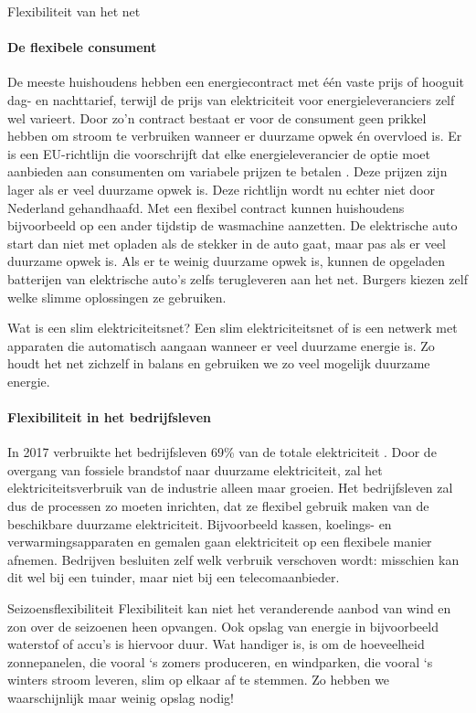 \begin{voorstel}{Flexibiliteit van het net}
\begin{multicols*}{2}
\begin{overwegingen}
\paragraph{De flexibele consument}
De meeste huishoudens hebben een energiecontract met één vaste prijs of hooguit dag- en nachttarief, terwijl de prijs van elektriciteit voor energieleveranciers zelf wel varieert. Door zo'n contract bestaat er voor de consument geen prikkel hebben om stroom te verbruiken wanneer er duurzame opwek én overvloed is. Er is een EU-richtlijn die voorschrijft dat elke energieleverancier de optie moet aanbieden aan consumenten om variabele prijzen te betalen \parencite{europees_parlement_richtlijn_2019}. Deze prijzen zijn lager als er veel duurzame opwek is. Deze richtlijn wordt nu echter niet door Nederland gehandhaafd. Met een flexibel contract kunnen huishoudens bijvoorbeeld op een ander tijdstip de wasmachine aanzetten. De elektrische auto start dan niet met opladen als de stekker in de auto gaat, maar pas als er veel duurzame opwek is. Als er te weinig duurzame opwek is, kunnen de opgeladen batterijen van elektrische auto’s zelfs terugleveren aan het net. Burgers kiezen zelf welke slimme oplossingen ze gebruiken.

\begin{infobox}{Wat is een slim elektriciteitsnet?}
Een slim elektriciteitsnet of  is een netwerk met apparaten die automatisch aangaan wanneer er veel duurzame energie is. Zo houdt het net zichzelf in balans en gebruiken we zo veel mogelijk duurzame energie.
\end{infobox}

\paragraph{Flexibiliteit in het bedrijfsleven}
In 2017 verbruikte het bedrijfsleven 69\% van de totale elektriciteit \parencite{centraal_bureau_voor_de_statistiek_statline_nodate}. Door de overgang van fossiele brandstof naar duurzame elektriciteit, zal het elektriciteitsverbruik van de industrie alleen maar groeien. Het bedrijfsleven zal dus de processen zo moeten inrichten, dat ze flexibel gebruik maken van de beschikbare duurzame elektriciteit. Bijvoorbeeld kassen, koelings- en verwarmingsapparaten en gemalen gaan elektriciteit op een flexibele manier afnemen. Bedrijven besluiten zelf welk verbruik verschoven wordt: misschien kan dit wel bij een tuinder, maar niet bij een telecomaanbieder.

\begin{infobox}{Seizoensflexibiliteit}
Flexibiliteit kan niet het veranderende aanbod van wind en zon over de seizoenen heen opvangen. Ook opslag van energie in bijvoorbeeld waterstof of accu’s is hiervoor duur. Wat handiger is, is om de hoeveelheid zonnepanelen, die vooral ‘s zomers produceren, en windparken, die vooral ‘s winters stroom leveren, slim op elkaar af te stemmen. Zo hebben we waarschijnlijk maar weinig opslag nodig!
\end{infobox}


\end{overwegingen}
\end{multicols*}
\end{voorstel}
